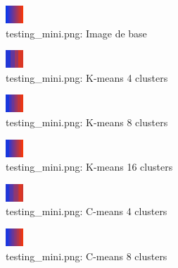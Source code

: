 \documentclass{article}
\begin{document}

  \begin{figure}[h]
    \centering
    \includegraphics[scale=8]{images/testing_mini.png}
    \caption{testing\_mini.png: Image de base}
    \label{fig:}
  \end{figure}

  \begin{figure}[h]
    \centering
    \includegraphics[scale=6]{images/result_testing_mini_k_4.png}
    \caption{testing\_mini.png: K-means 4 clusters}
    \label{fig:}
  \end{figure}

  \begin{figure}[h]
    \centering
    \includegraphics[scale=6]{images/result_testing_mini_k_8.png}
    \caption{testing\_mini.png: K-means 8 clusters}
    \label{fig:}
  \end{figure}

  \begin{figure}[h]
    \centering
    \includegraphics[scale=6]{images/result_testing_mini_k_16.png}
    \caption{testing\_mini.png: K-means 16 clusters}
    \label{fig:}
  \end{figure}

  \begin{figure}[h]
    \centering
    \includegraphics[scale=6]{images/result_testing_mini_c_4.png}
    \caption{testing\_mini.png: C-means 4 clusters}
    \label{fig:}
  \end{figure}

  \begin{figure}[h]
    \centering
    \includegraphics[scale=6]{images/result_testing_mini_c_8.png}
    \caption{testing\_mini.png: C-means 8 clusters}
    \label{fig:}
  \end{figure}
\end{document}
